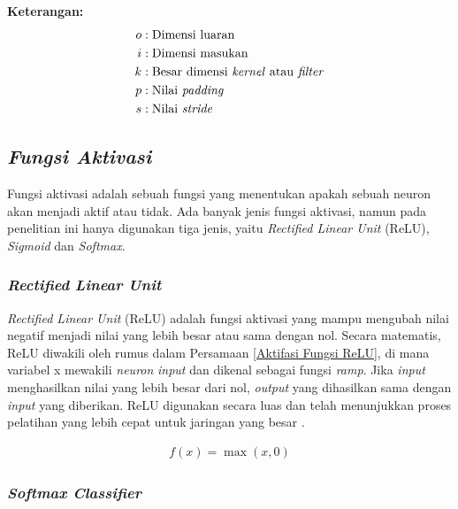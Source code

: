     \textbf{Keterangan:}
        \begin{align*}
        o & : \text{Dimensi luaran} \\
        i & : \text{Dimensi masukan} \\
        k & : \text{Besar dimensi \textit{kernel} atau \textit{filter}} \\
        p & : \text{Nilai \textit{padding}} \\
        s & : \text{Nilai \textit{stride}}
        \end{align*}
        



\subsection{\textit{Fungsi Aktivasi}}

Fungsi aktivasi adalah sebuah fungsi yang menentukan apakah sebuah neuron akan menjadi aktif atau tidak. Ada banyak jenis fungsi aktivasi, namun pada penelitian ini hanya digunakan tiga jenis, yaitu \textit{Rectified Linear Unit} (ReLU), \textit{Sigmoid }dan \textit{Softmax}.



\subsubsection{\textit{Rectified Linear Unit}}
    \textit{Rectified Linear Unit} (ReLU) adalah fungsi aktivasi yang mampu mengubah nilai negatif menjadi nilai yang lebih besar atau sama dengan nol. Secara matematis, ReLU diwakili oleh rumus dalam Persamaan \ref{Aktifasi Fungsi ReLU}, di mana variabel x mewakili \textit{neuron} \textit{input} dan dikenal sebagai fungsi \textit{ramp}. Jika \textit{input} menghasilkan nilai yang lebih besar dari nol, \textit{output} yang dihasilkan sama dengan \textit{input} yang diberikan. ReLU digunakan secara luas dan telah menunjukkan proses pelatihan yang lebih cepat untuk jaringan yang besar \cite{Dewi2018}.


    \begin{equation}
        \begin{aligned}
            f(x) = \max(x, 0)
        \end{aligned}\label{Aktifasi Fungsi ReLU}
    \end{equation}



\subsubsection{\textit{Softmax Classifier}}

